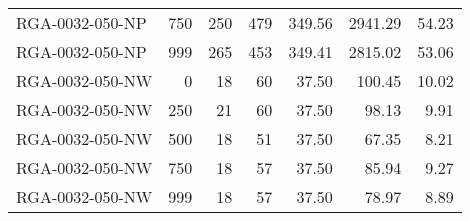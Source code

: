 \begin{table}[htbp]
{\begin{tabular}{lrrrrrr}
    RGA-0032-050-NP & 750    & 250    & 479    & 349.56 & 2941.29 & 54.23 \\
    RGA-0032-050-NP & 999    & 265    & 453    & 349.41 & 2815.02 & 53.06 \\ \hline
    RGA-0032-050-NW & 0      & 18     & 60     & 37.50  & 100.45 & 10.02 \\
    RGA-0032-050-NW & 250    & 21     & 60     & 37.50  & 98.13  & 9.91 \\
    RGA-0032-050-NW & 500    & 18     & 51     & 37.50  & 67.35  & 8.21 \\
    RGA-0032-050-NW & 750    & 18     & 57     & 37.50  & 85.94  & 9.27 \\
    RGA-0032-050-NW & 999    & 18     & 57     & 37.50  & 78.97  & 8.89 \\
    \bottomrule
    \end{tabular}}
  \label{tab:addlabel}%
\end{table}%
